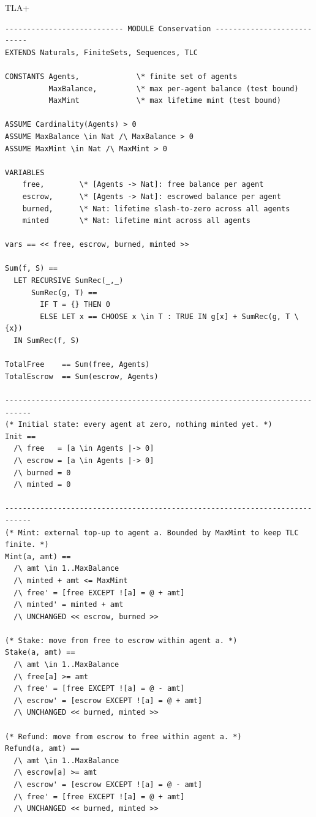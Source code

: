 \documentclass[11pt,a4paper]{article}
\theoremstyle{definition}
\theoremstyle{remark}
\begin{document}
\begin{pdlisting}{TLA+}{}
\begin{lstlisting}[style=tlaplus, caption={TLA$^{+}$: the checked ledger model, \texttt{Conservation.tla}, header comment omitted}, label={alg:bonded-conservation}]
--------------------------- MODULE Conservation ---------------------------
EXTENDS Naturals, FiniteSets, Sequences, TLC

CONSTANTS Agents,             \* finite set of agents
          MaxBalance,         \* max per-agent balance (test bound)
          MaxMint             \* max lifetime mint (test bound)

ASSUME Cardinality(Agents) > 0
ASSUME MaxBalance \in Nat /\ MaxBalance > 0
ASSUME MaxMint \in Nat /\ MaxMint > 0

VARIABLES
    free,        \* [Agents -> Nat]: free balance per agent
    escrow,      \* [Agents -> Nat]: escrowed balance per agent
    burned,      \* Nat: lifetime slash-to-zero across all agents
    minted       \* Nat: lifetime mint across all agents

vars == << free, escrow, burned, minted >>

Sum(f, S) ==
  LET RECURSIVE SumRec(_,_)
      SumRec(g, T) ==
        IF T = {} THEN 0
        ELSE LET x == CHOOSE x \in T : TRUE IN g[x] + SumRec(g, T \ {x})
  IN SumRec(f, S)

TotalFree    == Sum(free, Agents)
TotalEscrow  == Sum(escrow, Agents)

----------------------------------------------------------------------------
(* Initial state: every agent at zero, nothing minted yet. *)
Init ==
  /\ free   = [a \in Agents |-> 0]
  /\ escrow = [a \in Agents |-> 0]
  /\ burned = 0
  /\ minted = 0

----------------------------------------------------------------------------
(* Mint: external top-up to agent a. Bounded by MaxMint to keep TLC finite. *)
Mint(a, amt) ==
  /\ amt \in 1..MaxBalance
  /\ minted + amt <= MaxMint
  /\ free' = [free EXCEPT ![a] = @ + amt]
  /\ minted' = minted + amt
  /\ UNCHANGED << escrow, burned >>

(* Stake: move from free to escrow within agent a. *)
Stake(a, amt) ==
  /\ amt \in 1..MaxBalance
  /\ free[a] >= amt
  /\ free' = [free EXCEPT ![a] = @ - amt]
  /\ escrow' = [escrow EXCEPT ![a] = @ + amt]
  /\ UNCHANGED << burned, minted >>

(* Refund: move from escrow to free within agent a. *)
Refund(a, amt) ==
  /\ amt \in 1..MaxBalance
  /\ escrow[a] >= amt
  /\ escrow' = [escrow EXCEPT ![a] = @ - amt]
  /\ free' = [free EXCEPT ![a] = @ + amt]
  /\ UNCHANGED << burned, minted >>


\end{lstlisting}
\end{pdlisting}
\end{document}
